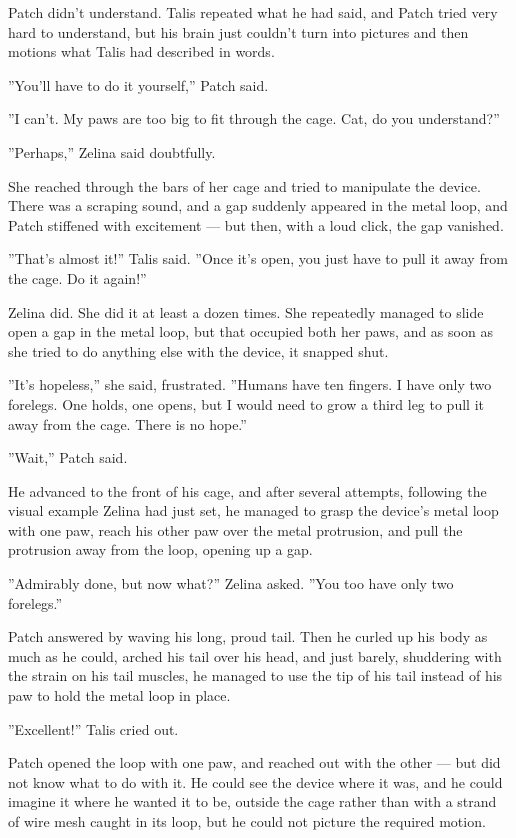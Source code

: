 \documentclass[12pt]{book}
\begin{document}
Patch didn't understand. Talis repeated what he had said, and Patch
tried very hard to understand, but his brain just couldn't turn into
pictures and then motions what Talis had described in words.

''You'll have to do it yourself,'' Patch said.

''I can't. My paws are too big to fit through the cage. Cat, do you
understand?''

''Perhaps,'' Zelina said doubtfully.

She reached through the bars of her cage and tried to manipulate the
device. There was a scraping sound, and a gap suddenly appeared in the
metal loop, and Patch stiffened with excitement --- but then, with a
loud click, the gap vanished.

''That's almost it!'' Talis said. ''Once it's open, you just have to
pull it away from the cage. Do it again!''

Zelina did. She did it at least a dozen times. She repeatedly managed
to slide open a gap in the metal loop, but that occupied both her
paws, and as soon as she tried to do anything else with the device, it
snapped shut.

''It's hopeless,'' she said, frustrated. ''Humans have ten fingers. I
have only two forelegs. One holds, one opens, but I would need to grow
a third leg to pull it away from the cage. There is no hope.''

''Wait,'' Patch said.

He advanced to the front of his cage, and after several attempts,
following the visual example Zelina had just set, he managed to grasp
the device's metal loop with one paw, reach his other paw over the
metal protrusion, and pull the protrusion away from the loop, opening
up a gap.

''Admirably done, but now what?'' Zelina asked. ''You too have only
two forelegs.''

Patch answered by waving his long, proud tail. Then he curled up his
body as much as he could, arched his tail over his head, and just
barely, shuddering with the strain on his tail muscles, he managed to
use the tip of his tail instead of his paw to hold the metal loop in
place.

''Excellent!'' Talis cried out.

Patch opened the loop with one paw, and reached out with the other ---
but did not know what to do with it. He could see the device where it
was, and he could imagine it where he wanted it to be, outside the
cage rather than with a strand of wire mesh caught in its loop, but he
could not picture the required motion.
\end{document}
